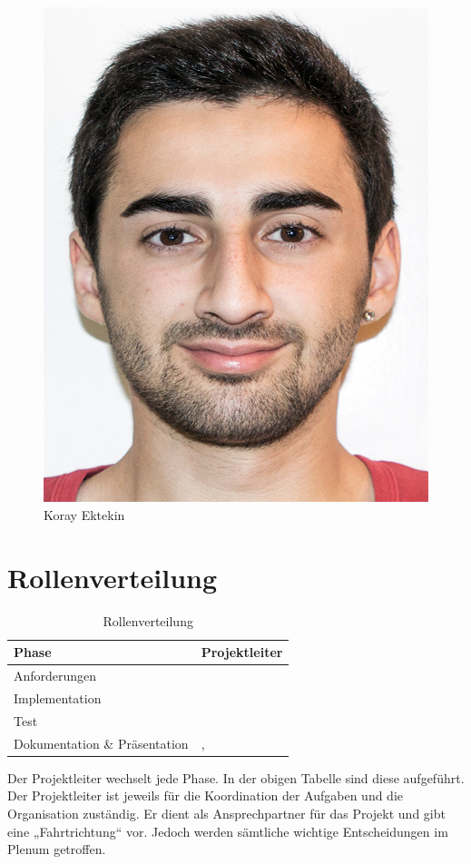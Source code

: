 \begin{figure}[htb]
\begin{minipage}{0.45\linewidth}
		\includegraphics[scale=0.9]{content/pictures/Koray.png}
		\caption{Koray Ektekin}
		\vspace{30pt}
	\end{minipage}
\end{figure}
\section{Rollenverteilung}
\begin{table}[h]
\centering
	\begin{tabular}{l|l}
		\toprule
		\textbf{Phase}& \textbf{Projektleiter}\\
		\midrule
		Anforderungen & \docDritterReferent 	\\ 
		Implementation& \docErsterReferent	\\
		Test		  & \docZweiterReferent	\\ 
		Dokumentation \& Präsentation	& \docVierterReferent, \docFuenfterReferent\\
		\bottomrule
	\end{tabular}
	\caption{Rollenverteilung}
\end{table}
\noindent 
Der Projektleiter wechselt jede Phase. In der obigen Tabelle sind diese aufgeführt.
Der Projektleiter ist jeweils für die Koordination der Aufgaben und die
Organisation zuständig. Er dient als Ansprechpartner für das Projekt und gibt
eine „Fahrtrichtung“ vor. Jedoch werden sämtliche wichtige Entscheidungen
im Plenum getroffen. 
